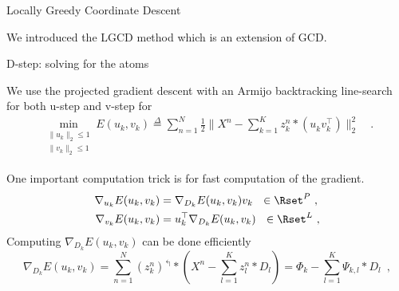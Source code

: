 \documentclass{beamer}
\def\keypoint#1{\hspace{0pt plus 1 filll}\textcolor{gray}{#1}}
\def\mycite#1{\keypoint{\small\citep{#1}}}
\begin{document}
\begin{frame}[noframenumbering]{Locally Greedy Coordinate Descent \mycite{Moreau2018}}


We introduced the LGCD method which is an extension of GCD.\\
{
    \centering
}

%
\visible<3->{
    With a partition $\mathcal C_m$ of the signal domain $[1, K]\times [0, \widetilde{T}[$,
    \[
    \mathcal C_m = [1, K]\times [\frac{(m-1)\widetilde{T}}{M}, \frac{m\widetilde{T}}{M}[
    \]%
}%


\end{frame}

\begin{frame}[noframenumbering]{D-step: solving for the atoms}

We use the projected gradient descent with an Armijo backtracking line-search \cite{Wright1999} for both u-step and v-step for
\begin{equation}
\begin{split}
\min_{\substack{\|u_{k}\|_2 \leq 1\\\|v_{k}\|_2 \leq 1}} E(u_k, v_k) \overset{\Delta}{=} \sum_{n=1}^N\frac{1}{2}\|X^n - \sum_{k=1}^K z^n_k * (u_k^{ }  v_k^\top) \|_{2}^{2} \hspace{6pt}
\enspace .
\end{split}
\end{equation}

One important computation trick is for fast computation of the gradient.
\[
\begin{split}
\nabla_{u_k} E(u_k, v_k) &=  \nabla_{D_k}E(u_k, v_k) v_k ~~ \in \Rset^{P}~,\\
\nabla_{v_k} E(u_k, v_k) &=  u_k^\top \nabla_{D_k} E(u_k, v_k)  ~~ \in \Rset^L~,
\end{split}
\]
Computing $\nabla_{D_k} E(u_k, v_k)$ can be done efficiently
\[
\nabla_{D_{k}} E(u_k, v_k) =  \sum_{n=1}^N (z_k^n)^\Lsh * \left(X^n - \sum_{l=1}^K z^n_l * D_l\right)
=  \Phi_k - \sum_{l=1}^K \Psi_{k, l} *  D_l \enspace ,
\]

\end{frame}
\end{document}
